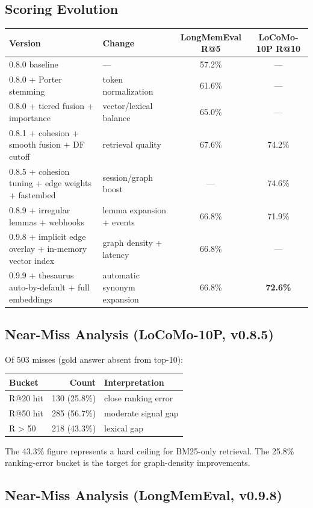 \documentclass[11pt,a4paper]{article}
\begin{document}
\subsection{Scoring Evolution}

\begin{longtable}{llcc}
\toprule
Version & Change & LongMemEval R@5 & LoCoMo-10P R@10 \\
\midrule
0.8.0 baseline & — & 57.2\% & — \\
0.8.0 + Porter stemming & token normalization & 61.6\% & — \\
0.8.0 + tiered fusion + importance & vector/lexical balance & 65.0\% & — \\
0.8.1 + cohesion + smooth fusion + DF cutoff & retrieval quality & 67.6\% & 74.2\% \\
0.8.5 + cohesion tuning + edge weights + fastembed & session/graph boost & — & 74.6\% \\
0.8.9 + irregular lemmas + webhooks & lemma expansion + events & 66.8\% & 71.9\% \\
0.9.8 + implicit edge overlay + in-memory vector index & graph density + latency & 66.8\% & — \\
0.9.9 + thesaurus auto-by-default + full embeddings & automatic synonym expansion & 66.8\% & \textbf{72.6\%} \\
\bottomrule
\end{longtable}

\subsection{Near-Miss Analysis (LoCoMo-10P, v0.8.5)}

Of 503 misses (gold answer absent from top-10):

\begin{tabular}{lrl}
\toprule
Bucket & Count & Interpretation \\
\midrule
R@20 hit & 130 (25.8\%) & close ranking error \\
R@50 hit & 285 (56.7\%) & moderate signal gap \\
R > 50 & 218 (43.3\%) & lexical gap \\
\bottomrule
\end{tabular}

The 43.3\% figure represents a hard ceiling for BM25-only retrieval. The 25.8\%
ranking-error bucket is the target for graph-density improvements.

\subsection{Near-Miss Analysis (LongMemEval, v0.9.8)}
\end{document}
